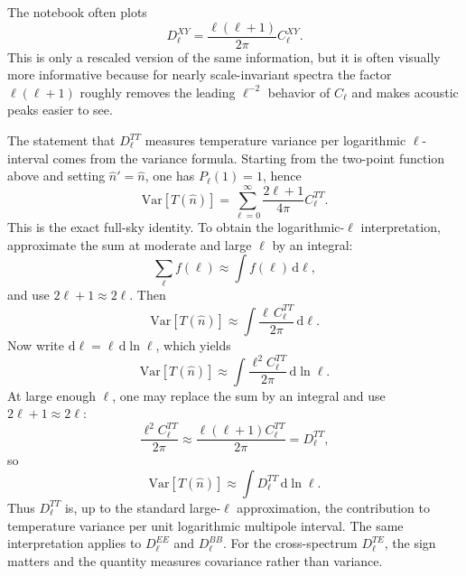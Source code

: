 \documentclass[11pt]{article}
\newcommand{\Var}{\mathrm{Var}}
\newcommand{\dd}{\mathrm{d}}
\begin{document}
The notebook often plots
\begin{equation}
  D_\ell^{XY} = \frac{\ell(\ell+1)}{2\pi} C_\ell^{XY}.
\end{equation}
This is only a rescaled version of the same information, but it is often visually more informative because for nearly scale-invariant spectra the factor \(\ell(\ell+1)\) roughly removes the leading \(\ell^{-2}\) behavior of \(C_\ell\) and makes acoustic peaks easier to see.

The statement that \(D_\ell^{TT}\) measures temperature variance per logarithmic \(\ell\)-interval comes from the variance formula. Starting from the two-point function above and setting \(\hat n'=\hat n\), one has \(P_\ell(1)=1\), hence
\begin{equation}
  \Var[T(\hat n)]
  =
  \sum_{\ell=0}^\infty \frac{2\ell+1}{4\pi} C_\ell^{TT}.
\end{equation}
This is the exact full-sky identity. To obtain the logarithmic-\(\ell\) interpretation, approximate the sum at moderate and large \(\ell\) by an integral:
\begin{equation}
  \sum_{\ell} f(\ell) \approx \int f(\ell)\,\dd\ell,
\end{equation}
and use \(2\ell+1\approx 2\ell\). Then
\begin{equation}
  \Var[T(\hat n)]
  \approx
  \int \frac{\ell\,C_\ell^{TT}}{2\pi}\,\dd\ell.
\end{equation}
Now write \(\dd\ell = \ell\,\dd\ln\ell\), which yields
\begin{equation}
  \Var[T(\hat n)]
  \approx
  \int \frac{\ell^2 C_\ell^{TT}}{2\pi}\,\dd\ln\ell.
\end{equation}
At large enough \(\ell\), one may replace the sum by an integral and use \(2\ell+1 \approx 2\ell\):
\begin{equation}
  \frac{\ell^2 C_\ell^{TT}}{2\pi}
  \approx
  \frac{\ell(\ell+1) C_\ell^{TT}}{2\pi}
  =
  D_\ell^{TT},
\end{equation}
so
\begin{equation}
  \Var[T(\hat n)]
  \approx
  \int D_\ell^{TT}\,\dd\ln\ell.
\end{equation}
Thus \(D_\ell^{TT}\) is, up to the standard large-\(\ell\) approximation, the contribution to temperature variance per unit logarithmic multipole interval. The same interpretation applies to \(D_\ell^{EE}\) and \(D_\ell^{BB}\). For the cross-spectrum \(D_\ell^{TE}\), the sign matters and the quantity measures covariance rather than variance.
\end{document}
